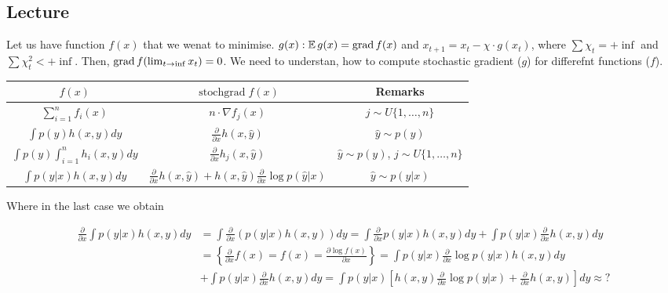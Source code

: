 \subsection{Lecture}

Let us have function $f(x)$ that we wenat to minimise. $g(x) : \operatorname{\mathbb{E}} g(x) = \operatorname{grad} f(x)$ and $x_{t + 1} = x_t - \chi \cdot g(x_t)$, where $\sum \chi_t = + \inf$ and $\sum \chi_t^2 < + \inf$. Then, $\operatorname{grad} f(\lim_{t \to \inf} x_t) = 0$. We need to understan, how to compute stochastic gradient ($g$) for differefnt functions ($f$). 

\begin{table}[!h]
    \centering
    \begin{tabular}{c | c | c}
        $f(x)$ & $\operatorname{stochgrad} f(x)$ & Remarks \\ \hline
        $\sum_{i = 1}^n f_i(x)$ & $n \cdot \nabla f_j(x)$ & $j \sim U\{1, \ldots, n\}$ \\ \hline
        $\int p(y) h(x, y) dy$ & $\frac{\partial}{\partial x} h(x, \widehat{y})$ & $\widehat{y} \sim p(y)$ \\ \hline 
        $\int p(y) \int_{i = 1}^n h_i(x, y) dy$ & $\frac{\partial}{\partial x} h_j(x, \widehat{y})$ & $\widehat{y} \sim p(y)$, $j \sim U\{1, \ldots, n\}$ \\ \hline
        $\int p(y | x) h(x, y) dy$ & $\frac{\partial}{\partial x} h(x, \widehat{y}) + h(x, \widehat{y}) \frac{\partial}{\partial x} \log p(\widehat{y}| x)$ & $\widehat{y} \sim p(y | x)$ \\ \hline
    \end{tabular}
\end{table}

Where in the last case we obtain 

\begin{equation*}
    \begin{aligned}
        \frac{\partial}{\partial x} \int p(y | x) h(x, y) dy &= \int \frac{\partial}{\partial x} \left( p(y | x) h(x, y) \right) dy = \int \frac{\partial}{\partial x} p(y | x) h(x, y) dy + \int p(y | x) \frac{\partial}{\partial x} h(x, y) dy \\ 
        &= \left\{ \frac{\partial}{\partial x} f(x) = f(x) = \frac{\partial \log f(x)}{\partial x} \right\} = \int p(y| x)\frac{\partial}{\partial x} \log p(y | x) h(x, y) dy \\ 
        &+ \int p(y | x) \frac{\partial}{\partial x} h(x, y) dy = \int p(y| x) \left[ h(x, y) \frac{\partial}{\partial x} \log p(y | x) + \frac{\partial}{\partial x} h(x, y) \right] dy \approx ?
    \end{aligned}
\end{equation*}

